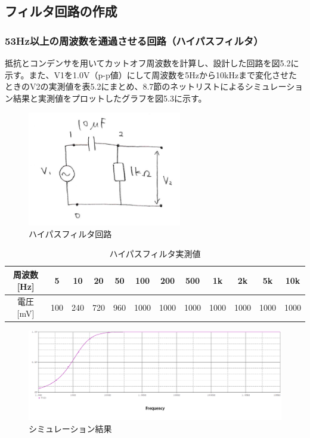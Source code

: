 \documentclass{jlreq}
\numberwithin{equation}{section}
\begin{document}
\subsection{フィルタ回路の作成}
\subsubsection{53Hz以上の周波数を通過させる回路（ハイパスフィルタ）}
抵抗とコンデンサを用いてカットオフ周波数を計算し、設計した回路を図5.2に示す。また、V1を1.0V（p-p値）にして周波数を5Hzから10kHzまで変化させたときのV2の実測値を表5.2にまとめ、8.7節のネットリストによるシミュレーション結果と実測値をプロットしたグラフを図5.3に示す。

\begin{figure}[H]
  \centering
  \includegraphics[width=0.6\textwidth]{assets/highpasskairo.png}
  \caption{ハイパスフィルタ回路}
\end{figure}

\begin{table}[H]
  \centering
  \caption{ハイパスフィルタ実測値}
  \begin{tabular}{|c|c|c|c|c|c|c|c|c|c|c|c|}
    \hline
    周波数 [Hz] & 5 & 10 & 20 & 50 & 100 & 200 & 500 & 1k & 2k & 5k & 10k \\ \hline
    電圧 [mV] & 100 & 240 & 720 & 960 & 1000 & 1000 & 1000 & 1000 & 1000 & 1000 & 1000 \\ \hline
  \end{tabular}
\end{table}

\begin{figure}[H]
  \centering
  \includegraphics[width=\textwidth]{assets/highpass.png}
  \caption{シミュレーション結果}
\end{figure}
\end{document}
